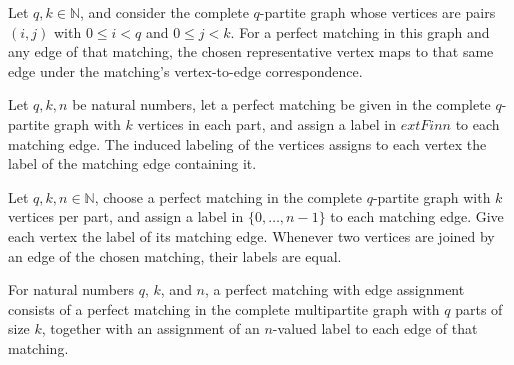 \begin{theorem}
\label{FABL.graphMatchingEdgeRepresentative_spec}
\leanok
{}
Let $q,k\in\mathbb{N}$, and consider the complete $q$-partite graph whose vertices are
pairs $(i,j)$ with $0\le i<q$ and $0\le j<k$. For a perfect matching in this graph and
any edge of that matching, the chosen representative vertex maps to that same edge under
the matching's vertex-to-edge correspondence.
\end{theorem}

\begin{definition}
\label{FABL.graphMatchingVertexLabel}
\leanok
{}
Let $q,k,n$ be natural numbers, let a perfect matching be given in the complete
$q$-partite graph with $k$ vertices in each part, and assign a label in $	ext{Fin }n$ to
each matching edge. The induced labeling of the vertices assigns to each vertex the
label of the matching edge containing it.
\end{definition}

\begin{theorem}
\label{FABL.graphMatchingVertexLabel_compatible}
\leanok
{}
Let $q,k,n\in\mathbb{N}$, choose a perfect matching in the complete $q$-partite graph
with $k$ vertices per part, and assign a label in $\{0,\ldots,n-1\}$ to each matching
edge. Give each vertex the label of its matching edge. Whenever two vertices are joined
by an edge of the chosen matching, their labels are equal.
\end{theorem}

\begin{definition}
\label{FABL.GraphMatchingEdgeAssignment}
\leanok
{}
For natural numbers $q$, $k$, and $n$, a perfect matching with edge assignment consists
of a perfect matching in the complete multipartite graph with $q$ parts of size $k$,
together with an assignment of an $n$-valued label to each edge of that matching.
\end{definition}

